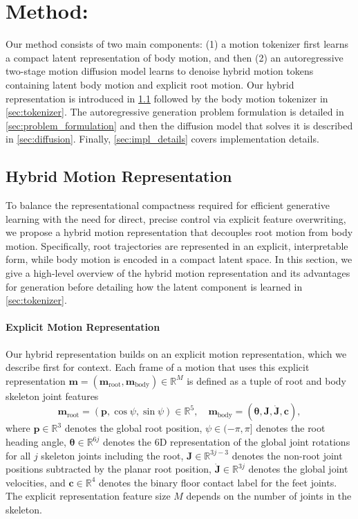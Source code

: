 \section{Method: \method}
\label{sec:method}
Our method \method consists of two main components: (1) a motion tokenizer first learns a compact latent representation of body motion, and then (2) an autoregressive two-stage motion diffusion model learns to denoise hybrid motion tokens containing latent body motion and explicit root motion.
Our hybrid representation is introduced in \cref{sec:hybrid_rep} followed by the body motion tokenizer in \cref{sec:tokenizer}. The autoregressive generation problem formulation is detailed in \cref{sec:problem_formulation} and then the diffusion model that solves it is described in \cref{sec:diffusion}.
Finally, \cref{sec:impl_details} covers implementation details.

\subsection{Hybrid Motion Representation}
\label{sec:hybrid_rep}
To balance the representational compactness required for efficient generative learning with the need for direct, precise control via explicit feature overwriting,
we propose a hybrid motion representation that decouples root motion from body motion. Specifically, root trajectories are represented in an explicit, interpretable form, while body motion is encoded in a compact latent space.
In this section, we give a high-level overview of the hybrid motion representation and its advantages for generation before detailing how the latent component is learned in \cref{sec:tokenizer}.

\paragraph{Explicit Motion Representation}
Our hybrid representation builds on an explicit motion representation, which we describe first for context. 
Each frame of a motion that uses this explicit representation $\mathbf{m} = (\mathbf{m}_\text{root}, \mathbf{m}_\text{body}) \in \mathbb{R}^M$ is defined as a tuple of root and body skeleton joint features 
\begin{equation}
    \mathbf{m}_\text{root} = (\mathbf{p}, \cos{\psi}, \sin{\psi}) \in \mathbb{R}^5, \quad \mathbf{m}_\text{body} = (\boldsymbol{\theta}, \mathbf{J}, \dot{\mathbf{J}}, \mathbf{c}),
\label{eqn:explicit_rep}
\end{equation}
where $\mathbf{p} \in \mathbb{R}^3$ denotes the global root position, $\psi \in (-\pi, \pi]$ denotes the root heading angle, $\boldsymbol{\theta} \in \mathbb{R}^{6j}$ denotes the 6D representation \cite{zhou2019continuity} of the global joint rotations for all $j$ skeleton joints including the root, $\mathbf{J} \in \mathbb{R}^{3j-3}$ denotes the non-root joint positions subtracted by the planar root position, $\dot{\mathbf{J}} \in \mathbb{R}^{3j}$ denotes the global joint velocities, and $\mathbf{c}  \in \mathbb{R}^{4}$ denotes the binary floor contact label for the feet joints.
The explicit representation feature size $M$ depends on the number of joints in the skeleton.

